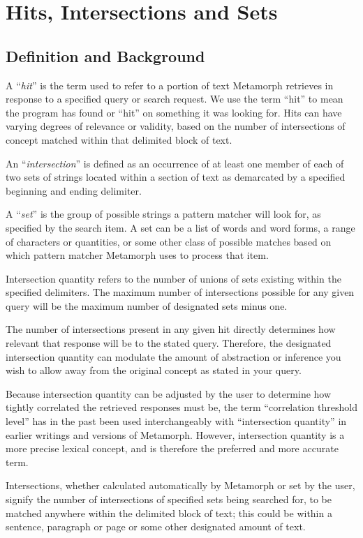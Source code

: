 \chapter{Hits, Intersections and Sets}

\section{Definition and Background}

A ``{\em hit}'' is the term used to refer to a portion of text
Metamorph retrieves in response to a specified query or search
request.  We use the term ``hit'' to mean the program has found or
``hit'' on something it was looking for.  Hits can have varying
degrees of relevance or validity, based on the number of intersections
of concept matched within that delimited block of text.

An ``{\em intersection}'' is defined as an occurrence of at least one
member of each of two sets of strings located within a section of text
as demarcated by a specified beginning and ending delimiter.

A ``{\em set}'' is the group of possible strings a pattern matcher
will look for, as specified by the search item.  A set can be a list
of words and word forms, a range of characters or quantities, or some
other class of possible matches based on which pattern matcher
Metamorph uses to process that item.

Intersection quantity refers to the number of unions of sets existing
within the specified delimiters.  The maximum number of intersections
possible for any given query will be the maximum number of designated
sets minus one.

The number of intersections present in any given hit directly
determines how relevant that response will be to the stated query.
Therefore, the designated intersection quantity can modulate the
amount of abstraction or inference you wish to allow away from the
original concept as stated in your query.

Because intersection quantity can be adjusted by the user to determine
how tightly correlated the retrieved responses must be, the term
``correlation threshold level'' has in the past been used
interchangeably with ``intersection quantity'' in earlier writings and
versions of Metamorph.  However, intersection quantity is a more
precise lexical concept, and is therefore the preferred and more
accurate term.

Intersections, whether calculated automatically by Metamorph or set by
the user, signify the number of intersections of specified sets being
searched for, to be matched anywhere within the delimited block of
text; this could be within a sentence, paragraph or page or some other
designated amount of text.

